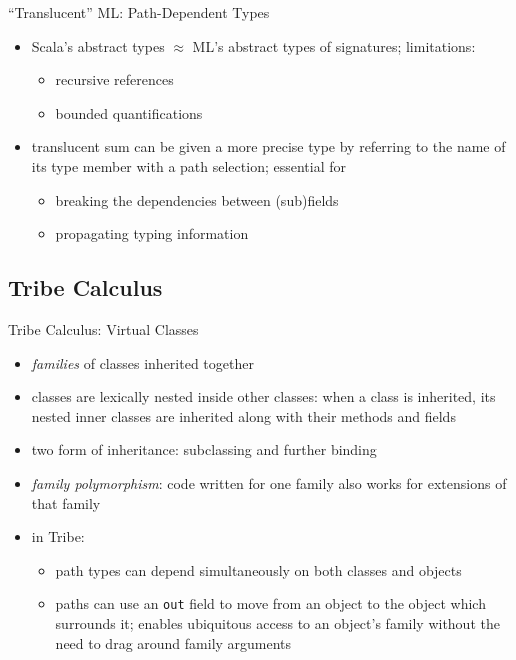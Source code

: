 \documentclass{beamer}
\begin{document}
\begin{frame}{``Translucent'' ML: Path-Dependent Types}
\begin{itemize}
\item Scala's abstract types  $\approx$ ML's abstract types of signatures; limitations:
\begin{itemize}
\item recursive references
\item bounded quantifications
\end{itemize}
\item translucent sum can be given a more precise type by referring to the name of its type member with a path selection; essential for %
\begin{itemize}
\item breaking the dependencies between (sub)fields
\item propagating typing information
\end{itemize}
\end{itemize}
\end{frame}

\subsection{Tribe Calculus}

\begin{frame}{Tribe Calculus: Virtual Classes}
\begin{itemize}
\item {\it families} of classes inherited together
\item classes are lexically nested inside other classes: when a class
  is inherited, its nested inner classes are inherited along with
  their methods and fields
\item two form of inheritance: subclassing and further binding
\item {\it family polymorphism}: code written for one family
  also works for extensions of that family
\item in Tribe:\begin{itemize}
\item path types can depend simultaneously on both classes and objects
\item paths can use an {\tt out} field to move from an object to the
  object which surrounds it; enables ubiquitous access to an object's
  family without the need to drag around family arguments
\end{itemize}
\end{itemize}
\end{frame}
\end{document}
